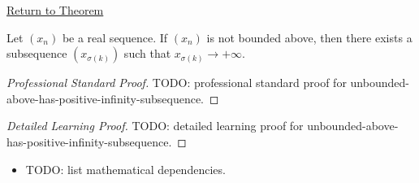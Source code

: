 \newpage
{}
\label{prf:unbounded-above-has-positive-infinity-subsequence}

\begin{remark*}[Return]
\hyperref[thm:unbounded-above-has-positive-infinity-subsequence]{Return to Theorem}
\end{remark*}

\begin{theorem*}
Let $(x_n)$ be a real sequence. If $(x_n)$ is not bounded above, then
there exists a subsequence $(x_{\sigma(k)})$ such that
$x_{\sigma(k)}\to+\infty$.

\smallskip
\noindent
\end{theorem*}

\begin{proof}[Professional Standard Proof]
\LRAProofBodyStart
TODO: professional standard proof for unbounded-above-has-positive-infinity-subsequence.
\end{proof}

\begin{proof}[Detailed Learning Proof]
\LRAProofBodyStart
TODO: detailed learning proof for unbounded-above-has-positive-infinity-subsequence.
\end{proof}

\begin{remark*}
\end{remark*}

\begin{dependencies}
\begin{itemize}
  \item TODO: list mathematical dependencies.
\end{itemize}
\end{dependencies}

\clearpage
